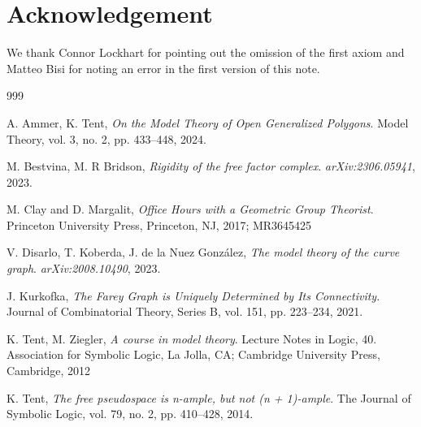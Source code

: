 \documentclass{amsart}
\begin{document}
\section{Acknowledgement}
We thank Connor Lockhart for pointing out the omission of the first axiom and Matteo Bisi for noting an error in the first version of this note.

\begin{thebibliography}{999}

 
  A. Ammer, K. Tent, \emph{On the Model Theory of Open Generalized Polygons}. Model Theory, vol. 3, no. 2, pp. 433--448, 2024. 


 M. Bestvina, M. R Bridson, \emph{Rigidity of the free factor complex}. \textit{arXiv:2306.05941}, 2023. 

 M. Clay and D. Margalit, \emph{Office Hours with a Geometric Group Theorist}. Princeton University Press, Princeton, NJ, 2017; MR3645425


 V. Disarlo, T. Koberda, J. de la Nuez González, \emph{The model theory of the curve graph}. \textit{arXiv:2008.10490}, 2023.

J. Kurkofka, 
\emph{The Farey Graph is Uniquely Determined by Its Connectivity}. 
Journal of Combinatorial Theory, Series B, 
vol. 151, pp. 223–234, 2021. 

 K. Tent, M. Ziegler, \emph{A course in model theory}. Lecture Notes in Logic, 40. Association for Symbolic Logic, La Jolla, CA; Cambridge University Press, Cambridge, 2012
		
 K. Tent, \emph{The free pseudospace is n-ample, but not (n + 1)-ample}. The Journal of Symbolic Logic, 
vol. 79, no. 2, pp. 410–428, 2014. 

\end{thebibliography}
\end{document}
